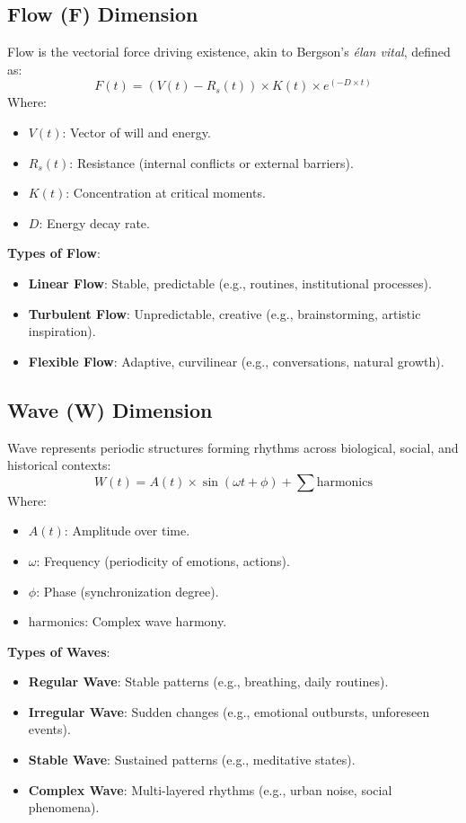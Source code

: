 \documentclass{article}
\begin{document}
\subsection{Flow (F) Dimension}
Flow is the vectorial force driving existence, akin to Bergson’s \textit{élan vital}, defined as:
$$
F(t) = (V(t) - R_s(t)) \times K(t) \times e^{(-D \times t)}
$$
Where:
\begin{itemize}
    \item $V(t)$: Vector of will and energy.
    \item $R_s(t)$: Resistance (internal conflicts or external barriers).
    \item $K(t)$: Concentration at critical moments.
    \item $D$: Energy decay rate.
\end{itemize}

\textbf{Types of Flow}:
\begin{itemize}
    \item \textbf{Linear Flow}: Stable, predictable (e.g., routines, institutional processes).
    \item \textbf{Turbulent Flow}: Unpredictable, creative (e.g., brainstorming, artistic inspiration).
    \item \textbf{Flexible Flow}: Adaptive, curvilinear (e.g., conversations, natural growth).
\end{itemize}

\subsection{Wave (W) Dimension}
Wave represents periodic structures forming rhythms across biological, social, and historical contexts:
$$
W(t) = A(t) \times \sin(\omega t + \phi) + \sum \text{harmonics}
$$
Where:
\begin{itemize}
    \item $A(t)$: Amplitude over time.
    \item $\omega$: Frequency (periodicity of emotions, actions).
    \item $\phi$: Phase (synchronization degree).
    \item $\text{harmonics}$: Complex wave harmony.
\end{itemize}

\textbf{Types of Waves}:
\begin{itemize}
    \item \textbf{Regular Wave}: Stable patterns (e.g., breathing, daily routines).
    \item \textbf{Irregular Wave}: Sudden changes (e.g., emotional outbursts, unforeseen events).
    \item \textbf{Stable Wave}: Sustained patterns (e.g., meditative states).
    \item \textbf{Complex Wave}: Multi-layered rhythms (e.g., urban noise, social phenomena).
\end{itemize}
\end{document}
